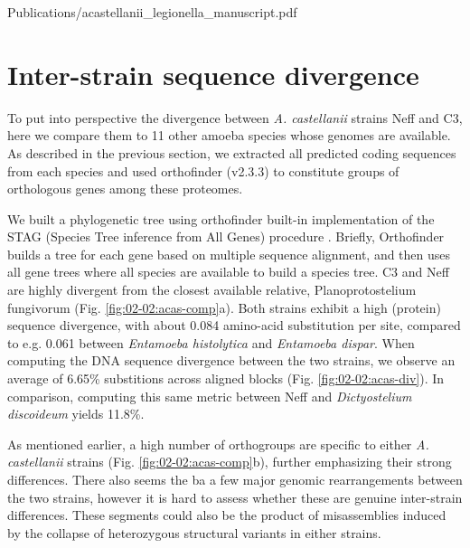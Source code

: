 
     {Publications/acastellanii_legionella_manuscript.pdf}    


\section{Inter-strain sequence divergence}

To put into perspective the divergence between \textit{A. castellanii} strains Neff and C3, here we compare them to 11 other amoeba species whose genomes are available. As described in the previous section, we extracted all predicted coding sequences from each species and used orthofinder (v2.3.3) to constitute groups of orthologous genes among these proteomes.

We built a phylogenetic tree using orthofinder built-in implementation of the STAG (Species Tree inference from All Genes) procedure \cite{emmsSTAGSpeciesTree2018stag}. Briefly, Orthofinder builds a tree for each gene based on multiple sequence alignment, and then uses all gene trees where all species are available to build a species tree. C3 and Neff are highly divergent from the closest available relative, Planoprotostelium fungivorum (Fig. \ref{fig:02-02:acas-comp}a). Both strains exhibit a high (protein) sequence divergence, with about 0.084 amino-acid substitution per site, compared to e.g. 0.061 between \textit{Entamoeba histolytica} and \textit{Entamoeba dispar}. When computing the DNA sequence divergence between the two strains, we observe an average of 6.65\% substitions across aligned blocks (Fig. \ref{fig:02-02:acas-div}). In comparison, computing this same metric between Neff and \textit{Dictyostelium discoideum} yields 11.8\%.

As mentioned earlier, a high number of orthogroups are specific to either \textit{A. castellanii} strains (Fig. \ref{fig:02-02:acas-comp}b), further emphasizing their strong differences. There also seems the ba a few major genomic rearrangements between the two strains, however it is hard to assess whether these are genuine inter-strain differences. These segments could also be the product of misassemblies induced by the collapse of heterozygous structural variants in either strains.



